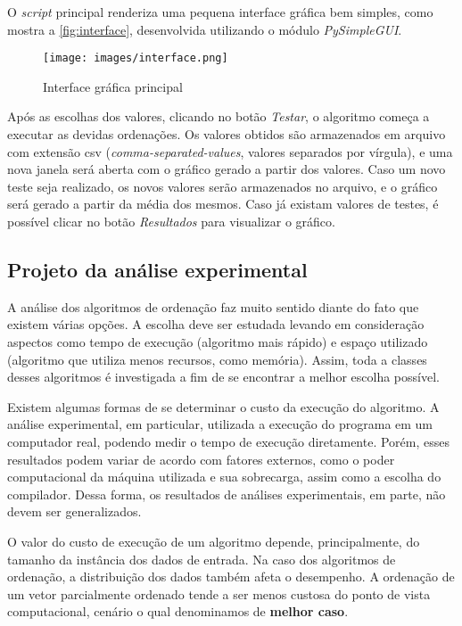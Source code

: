 \documentclass[12pt]{article}
\begin{document}
O \textit{script} principal renderiza uma pequena interface gráfica bem simples, como mostra a \autoref{fig:interface}, desenvolvida utilizando o módulo \textit{PySimpleGUI}.

\begin{figure}[h]
	\centering
	\caption{Interface gráfica principal}
	\texttt{[image: images/interface.png]}
	\label{fig:interface}
\end{figure}

Após as escolhas dos valores, clicando no botão \textit{Testar}, o algoritmo começa a executar as devidas ordenações. Os valores obtidos são armazenados em arquivo com extensão csv (\textit{comma-separated-values}, valores separados por vírgula), e uma nova janela será aberta com o gráfico gerado a partir dos valores. Caso um novo teste seja realizado, os novos valores serão armazenados no arquivo, e o gráfico será gerado a partir da média dos mesmos. Caso já existam valores de testes, é possível clicar no botão \textit{Resultados} para visualizar o gráfico.

\subsection{Projeto da análise experimental}

A análise dos algoritmos de ordenação faz muito sentido diante do fato que existem várias opções. A escolha deve ser estudada levando em consideração aspectos como tempo de execução (algoritmo mais rápido) e espaço utilizado (algoritmo que utiliza menos recursos, como memória). Assim, toda a classes desses algoritmos é investigada a fim de se encontrar a melhor escolha possível. \cite{projeto:99}

Existem algumas formas de se determinar o custo da execução do algoritmo. A análise experimental, em particular, utilizada a execução do programa em um computador real, podendo medir o tempo de execução diretamente. Porém, esses resultados podem variar de acordo com fatores externos, como o poder computacional da máquina utilizada e sua sobrecarga, assim como a escolha do compilador. Dessa forma, os resultados de análises experimentais, em parte, não devem ser generalizados. \cite{projeto:99}

O valor do custo de execução de um algoritmo depende, principalmente, do tamanho da instância dos dados de entrada. Na caso dos algoritmos de ordenação, a distribuição dos dados também afeta o desempenho. A ordenação de um vetor parcialmente ordenado tende a ser menos custosa do ponto de vista computacional, cenário o qual denominamos de \textbf{melhor caso}. \cite{projeto:99}
\end{document}
